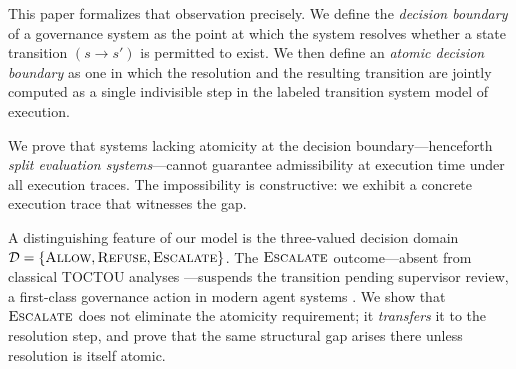 \documentclass[11pt]{article}
\theoremstyle{plain}
\theoremstyle{definition}
\theoremstyle{remark}
\newcommand{\Allow}{\textsc{Allow}}
\newcommand{\Refuse}{\textsc{Refuse}}
\newcommand{\Escalate}{\textsc{Escalate}}
\newcommand{\Dset}{\mathcal{D}}
\begin{document}
This paper formalizes that observation precisely.  We define the
\emph{decision boundary} of a governance system as the point at which the
system resolves whether a state transition $(s \to s')$ is permitted to exist.
We then define an \emph{atomic decision boundary} as one in which the
resolution and the resulting transition are jointly computed as a single
indivisible step in the labeled transition system model of execution.

We prove that systems lacking atomicity at the decision boundary---henceforth
\emph{split evaluation systems}---cannot guarantee admissibility at execution
time under all execution traces.  The impossibility is constructive: we exhibit
a concrete execution trace that witnesses the gap.

A distinguishing feature of our model is the three-valued decision domain
$\Dset = \{\Allow, \Refuse, \Escalate\}$.
The $\Escalate$ outcome---absent from classical TOCTOU analyses
\cite{bishop96, tsafrir08}---suspends the transition pending supervisor review,
a first-class governance action in modern agent systems \cite{acp26}.
We show that $\Escalate$ does not eliminate the atomicity requirement; it
\emph{transfers} it to the resolution step, and prove that the same
structural gap arises there unless resolution is itself atomic.
\end{document}
